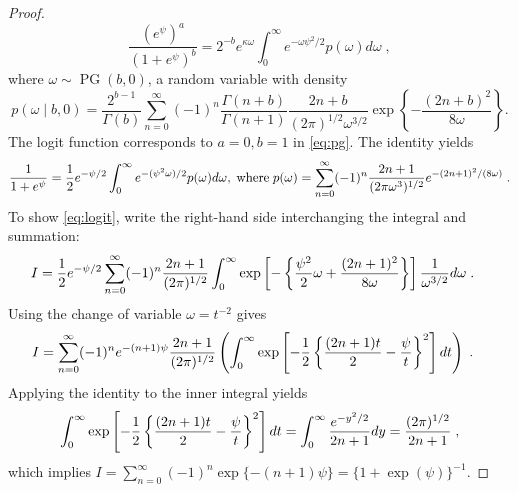 \documentclass[11pt]{article}
\begin{document}
\begin{proof}
\begin{equation}
  \frac{(e^{\psi})^a}{(1+e^{\psi})^b} = 2^{-b} e^{\kappa \omega} 
  \int_0^{\infty} e^{-\omega \psi^2/2} p(\omega) d\omega
  \;, 
  \label{eq:pg}
\end{equation}
where $\omega \sim \operatorname{PG}(b,0)$, a \PG{} random variable with density
\[
p(\omega \mid b, 0) = \frac{2^{b-1}}{\Gamma(b)} \sum_{n=0}^{\infty} (-1)^n \frac{\Gamma(n+b)}{\Gamma(n+1)} \frac{2n + b}{(2 \pi)^{1/2} \omega^{3/2}} 
\exp\left\{-\frac{(2 n + b)^2}{8 \omega} \right\}.
\]
The logit function corresponds to $a=0,b=1$ in \eqref{eq:pg}. The \CS{} identity yields
\begin{equation}
  \frac{1}{1+e^{\psi}} = \frac{1}{2} e^{- \psi/2} \int_0^{\infty} e^{-(\psi^2\omega)/2} p(\omega) d\omega, \; \mbox{where} \; p(\omega) = \sum_{n=0}^{\infty} (-1)^n \frac{2n+1}{ (2 \pi \omega^3)^{1/2}} e^{-(2n+1)^2/(8 \omega)}
  \label{eq:logit}\;.
\end{equation}
To show \eqref{eq:logit}, write the right-hand side interchanging the integral and summation:
\begin{align*}
  I & = \frac{1}{2} e^{-\psi/2} \sum_{n=0}^{\infty} (-1)^n \frac{2n+1}{(2 \pi)^{1/2}}  \int_0^{\infty} \exp\left[-\left\{ \frac{\psi^2}{2} \omega + \frac{(2n+1)^2}{8 \omega} \right\} \right] \frac{1}{\omega^{3/2}} d\omega \;. 
\end{align*}
Using the change of variable $\omega = t^{-2}$ gives
\begin{align*}
  I & = \sum_{n=0}^{\infty} (-1)^n e^{-(n+1)\psi} 
  \frac{2n + 1}{(2 \pi)^{1/2}} 
  \left( \int_{0}^{\infty} 
    \exp\left[-\frac{1}{2} \left\{ \frac{(2n+1)t}{2} - \frac{\psi}{t}\right\}^2 \right] dt 
  \right)
  \;.
\end{align*}
Applying the \CS{} identity to the inner integral yields 
\[
\int_{0}^{\infty} 
\exp\left[-\frac{1}{2} \left\{ \frac{(2n+1)t}{2} - \frac{\psi}{t}\right \}^2 \right] dt 
= \int_0^{\infty} \frac{e^{-y^2/2}}{2n+1} dy= \frac{(2\pi)^{1/2}}{2n+1}
\;,
\]
which implies $I = \sum_{n=0}^{\infty} (-1)^n \exp\{-(n+1) \psi\} = \{1+\exp(\psi)\}^{-1}$. 
\end{proof}
\end{document}
